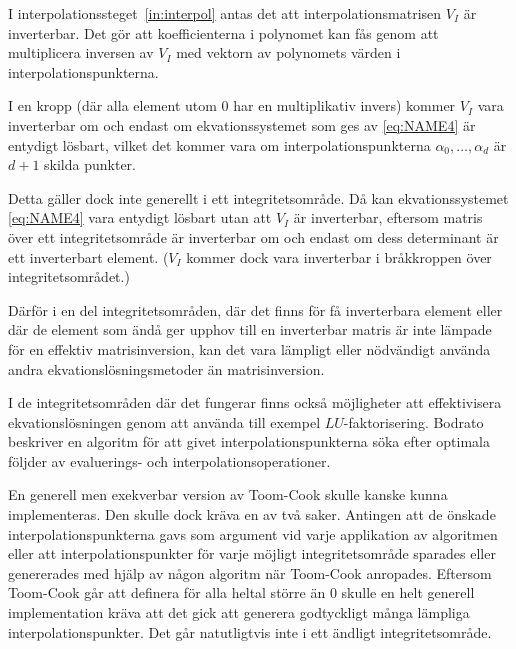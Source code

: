 I interpolationssteget~\ref{in:interpol} antas det att interpolationsmatrisen
$V_I$ är inverterbar. Det gör att koefficienterna i polynomet kan fås genom att
multiplicera inversen av $V_I$ med vektorn av polynomets värden i
interpolationspunkterna.

I en kropp (där alla element utom 0 har en multiplikativ invers) kommer $V_I$
vara inverterbar om och endast om ekvationssystemet som ges av \ref{eq:NAME4}
är entydigt lösbart, vilket det kommer vara om interpolationspunkterna
$\alpha_0, \dots, \alpha_d$ är $d + 1$ skilda punkter.

Detta gäller dock inte generellt i ett integritetsområde. Då kan
ekvationssystemet \ref{eq:NAME4} vara entydigt lösbart utan att $V_I$ är
inverterbar, eftersom matris över ett integritetsområde är inverterbar om och
endast om dess determinant är ett inverterbart
element\cite{sombatboriboon2011some}. ($V_I$ kommer dock vara inverterbar i
bråkkroppen över integritetsområdet.)

Därför i en del integritetsområden, där det finns för få inverterbara element
eller där de element som ändå ger upphov till en inverterbar matris är inte
lämpade för en effektiv matrisinversion, kan det vara lämpligt eller nödvändigt
använda andra ekvationslösningsmetoder än matrisinversion.


I de integritetsområden där det fungerar finns också möjligheter att
effektivisera ekvationslösningen genom att använda till exempel
$LU$-faktorisering. Bodrato\cite{bodrato2007towards}\cite{bodrato2007integer}
beskriver en algoritm för att givet interpolationspunkterna söka efter optimala
följder av evaluerings- och interpolationsoperationer.

En generell men exekverbar version av Toom-Cook skulle kanske kunna
implementeras. Den skulle dock kräva en av två saker. Antingen att de önskade
interpolationspunkterna gavs som argument vid varje applikation av algoritmen
eller att interpolationspunkter för varje möjligt integritetsområde sparades
eller genererades med hjälp av någon algoritm när Toom-Cook anropades. Eftersom
Toom-Cook går att definera för alla heltal större än 0 skulle en helt generell
implementation kräva att det gick att generera godtyckligt många lämpliga
interpolationspunkter. Det går natutligtvis inte i ett ändligt
integritetsområde.

